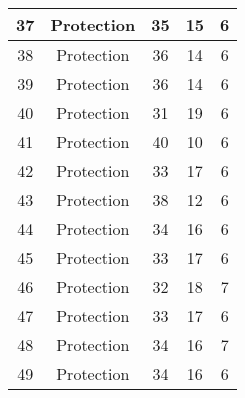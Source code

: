 \documentclass[results.tex]{subfiles}
\begin{document}
\begin{center}
\begin{tabular}{| c || c | c | c | c |}
            \hline
            37                      & Protection                   & 35                     & 15                      & 6                    \\
            \hline
            38                      & Protection                   & 36                     & 14                      & 6                    \\
            \hline
            39                      & Protection                   & 36                     & 14                      & 6                    \\
            \hline
            40                      & Protection                   & 31                     & 19                      & 6                    \\
            \hline
            41                      & Protection                   & 40                     & 10                      & 6                    \\
            \hline
            42                      & Protection                   & 33                     & 17                      & 6                    \\
            \hline
            43                      & Protection                   & 38                     & 12                      & 6                    \\
            \hline
            44                      & Protection                   & 34                     & 16                      & 6                    \\
            \hline
            45                      & Protection                   & 33                     & 17                      & 6                    \\
            \hline
            46                      & Protection                   & 32                     & 18                      & 7                    \\
            \hline
            47                      & Protection                   & 33                     & 17                      & 6                    \\
            \hline
            48                      & Protection                   & 34                     & 16                      & 7                    \\
            \hline
            49                      & Protection                   & 34                     & 16                      & 6                    \\
            \hline
        \end{tabular}
    \end{center}
\end{document}
